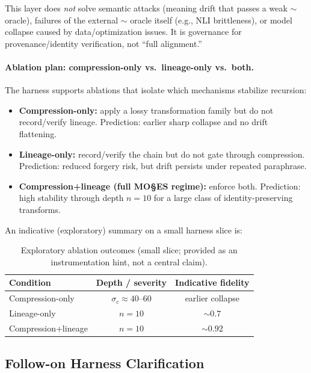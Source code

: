 \documentclass[11pt,a4paper]{article}
\begin{document}
This layer does \emph{not} solve semantic attacks (meaning drift that passes a weak $\sim$ oracle), failures of the external $\sim$ oracle itself (e.g., NLI brittleness), or model collapse caused by data/optimization issues. It is governance for provenance/identity verification, not ``full alignment.''

\paragraph{Ablation plan: compression-only vs.\ lineage-only vs.\ both.}
The harness supports ablations that isolate which mechanisms stabilize recursion:
\begin{itemize}
    \item \textbf{Compression-only:} apply a lossy transformation family but do not record/verify lineage. Prediction: earlier sharp collapse and no drift flattening.
    \item \textbf{Lineage-only:} record/verify the chain but do not gate through compression. Prediction: reduced forgery risk, but drift persists under repeated paraphrase.
    \item \textbf{Compression+lineage (full MO\S{}ES\texttrademark{} regime):} enforce both. Prediction: high stability through depth $n=10$ for a large class of identity-preserving transforms.
\end{itemize}

An indicative (exploratory) summary on a small harness slice is:
\begin{table}[htbp]
\centering
\begin{tabular}{lcc}
\toprule
\textbf{Condition} & \textbf{Depth / severity} & \textbf{Indicative fidelity} \\
\midrule
Compression-only & $\sigma_c \approx 40$--$60$ & earlier collapse \\
Lineage-only & $n=10$ & $\sim 0.7$ \\
Compression+lineage & $n=10$ & $\sim 0.92$ \\
\bottomrule
\end{tabular}
\caption{Exploratory ablation outcomes (small slice; provided as an instrumentation hint, not a central claim).}
\label{tab:ablation-hint}
\end{table}

\subsection{Follow-on Harness Clarification}
\label{sec:followon-harness}
\end{document}
